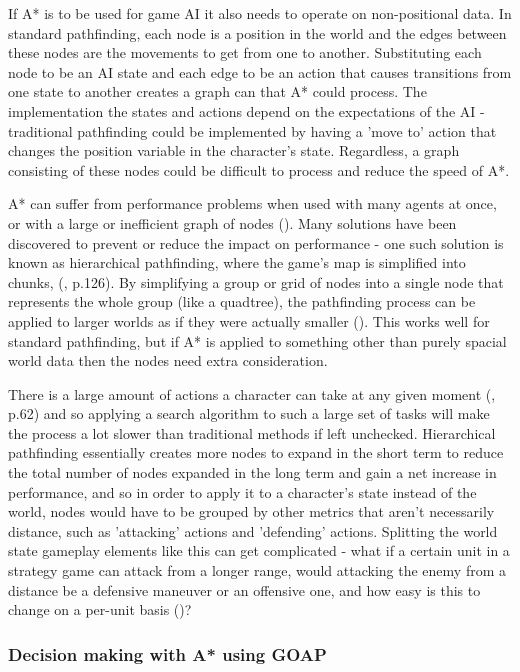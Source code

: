\documentclass[11pt, a4paper]{article}
\begin{document}
If A* is to be used for game AI it also needs to operate on non-positional data. In standard pathfinding, each node is a position in the world and the edges between these nodes are the movements to get from one to another. Substituting each node to be an AI state and each edge to be an action that causes transitions from one state to another creates a graph can that A* could process. The implementation the states and actions depend on the expectations of the AI - traditional pathfinding could be implemented by having a 'move to' action that changes the position variable in the character's state. Regardless, a graph consisting of these nodes could be difficult to process and reduce the speed of A*.

A* can suffer from performance problems when used with many agents at once, or with a large or inefficient graph of nodes (\cite{graham2003pathfinding}). Many solutions have been discovered to prevent or reduce the impact on performance - one such solution is known as hierarchical pathfinding, where the game's map is simplified into chunks, (\cite{cui2011based}, p.126). By simplifying a group or grid of nodes into a single node that represents the whole group (like a quadtree), the pathfinding process can be applied to larger worlds as if they were actually smaller (\cite{botea2004near}). This works well for standard pathfinding, but if A* is applied to something other than purely spacial world data then the nodes need extra consideration. 

There is a large amount of actions a character can take at any given moment (\cite{nareyek2004ai}, p.62) and so applying a search algorithm to such a large set of tasks will make the process a lot slower than traditional methods if left unchecked. Hierarchical pathfinding essentially creates more nodes to expand in the short term to reduce the total number of nodes expanded in the long term and gain a net increase in performance, and so in order to apply it to a character's state instead of the world, nodes would have to be grouped by other metrics that aren't necessarily distance, such as 'attacking' actions and 'defending' actions. Splitting the world state gameplay elements like this can get complicated - what if a certain unit in a strategy game can attack from a longer range, would attacking the enemy from a distance be a defensive maneuver or an offensive one, and how easy is this to change on a per-unit basis (\cite{weber2011building})?

\subsubsection{Decision making with A* using GOAP}
\end{document}
